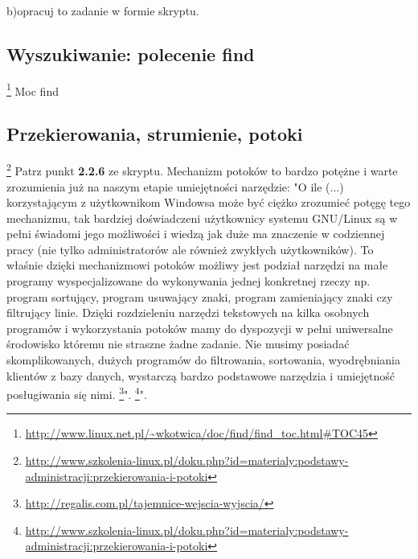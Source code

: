 \documentclass[a4paper,titlepage,12pt]{mwart}
\begin{document}
b)opracuj to zadanie w formie skryptu.
\subsection{Wyszukiwanie: polecenie \textbf{find}}
\footnote{\url{http://www.linux.net.pl/~wkotwica/doc/find/find_toc.html#TOC45}}
Moc find
\subsection{Przekierowania, strumienie, potoki}
\footnote{\url{http://www.szkolenia-linux.pl/doku.php?id=materialy:podstawy-administracji:przekierowania-i-potoki}}
Patrz punkt \textbf{2.2.6} ze skryptu.
Mechanizm potoków to bardzo potężne i warte zrozumienia już na naszym etapie umiejętności narzędzie: "O ile (...) korzystającym z użytkownikom Windowsa może być ciężko zrozumieć potęgę tego mechanizmu, tak bardziej doświadczeni użytkownicy systemu GNU/Linux są w pełni świadomi jego możliwości i wiedzą jak duże ma znaczenie w codziennej pracy (nie tylko administratorów ale również zwykłych użytkowników). To właśnie dzięki mechanizmowi potoków możliwy jest podział narzędzi na małe programy wyspecjalizowane do wykonywania jednej konkretnej rzeczy np. program sortujący, program usuwający znaki, program zamieniający znaki czy filtrujący linie. Dzięki rozdzieleniu narzędzi tekstowych na kilka osobnych programów i wykorzystania potoków mamy do dyspozycji w pełni uniwersalne środowisko któremu nie straszne żadne zadanie. Nie musimy posiadać skomplikowanych, dużych programów do filtrowania, sortowania, wyodrębniania klientów z bazy danych, wystarczą bardzo podstawowe narzędzia i umiejętność posługiwania się nimi. \footnote{\url{http://regalis.com.pl/tajemnice-wejscia-wyjscia/}}".
\footnote{\url{http://www.szkolenia-linux.pl/doku.php?id=materialy:podstawy-administracji:przekierowania-i-potoki}}".
\end{document}
